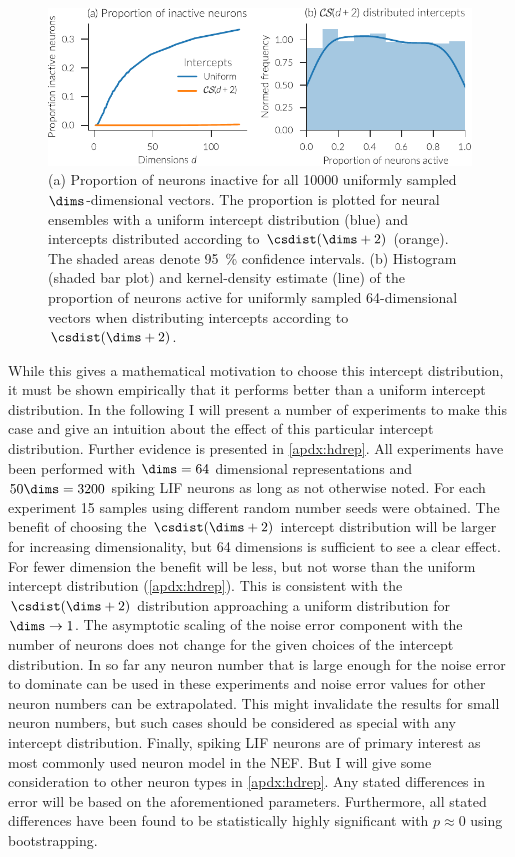 \begin{figure}
    \centering
    \includegraphics{figures/act-cs}
    \caption[Proportion of inactive neurons and its distribution]{(a) Proportion of neurons inactive for all \num{10000} uniformly sampled $\dims$-dimensional vectors. The proportion is plotted for neural ensembles with a uniform intercept distribution (blue) and intercepts distributed according to $\csdist(\dims + 2)$ (orange). The shaded areas denote \SI{95}{\percent} confidence intervals. (b) Histogram (shaded bar plot) and kernel-density estimate (line) of the proportion of neurons active for uniformly sampled 64-dimensional vectors when distributing intercepts according to $\csdist(\dims + 2)$.}\label{fig:act-cs}
\end{figure}

While this gives a mathematical motivation to choose this intercept distribution, it must be shown empirically that it performs better than a uniform intercept distribution.
In the following I will present a number of experiments to make this case and give an intuition about the effect of this particular intercept distribution.
Further evidence is presented in \cref{apdx:hdrep}.
All experiments have been performed with $\dims = 64$ dimensional representations and $50 \dims = 3200$ spiking LIF neurons as long as not otherwise noted.
For each experiment 15 samples using different random number seeds were obtained.
The benefit of choosing the $\csdist(\dims + 2)$ intercept distribution will be larger for increasing dimensionality, but 64 dimensions is sufficient to see a clear effect.
For fewer dimension the benefit will be less, but not worse than the uniform intercept distribution (\cref{apdx:hdrep}).
This is consistent with the $\csdist(\dims + 2)$ distribution approaching a uniform distribution for $\dims \rightarrow 1$.
The asymptotic scaling of the noise error component with the number of neurons does not change for the given choices of the intercept distribution.
In so far any neuron number that is large enough for the noise error to dominate can be used in these experiments and noise error values for other neuron numbers can be extrapolated.
This might invalidate the results for small neuron numbers, but such cases should be considered as special with any intercept distribution.
Finally, spiking LIF neurons are of primary interest as most commonly used neuron model in the NEF\@.
But I will give some consideration to other neuron types in \cref{apdx:hdrep}.
Any stated differences in error will be based on the aforementioned parameters.
Furthermore, all stated differences have been found to be statistically highly significant with $p \approx 0$ using bootstrapping.

